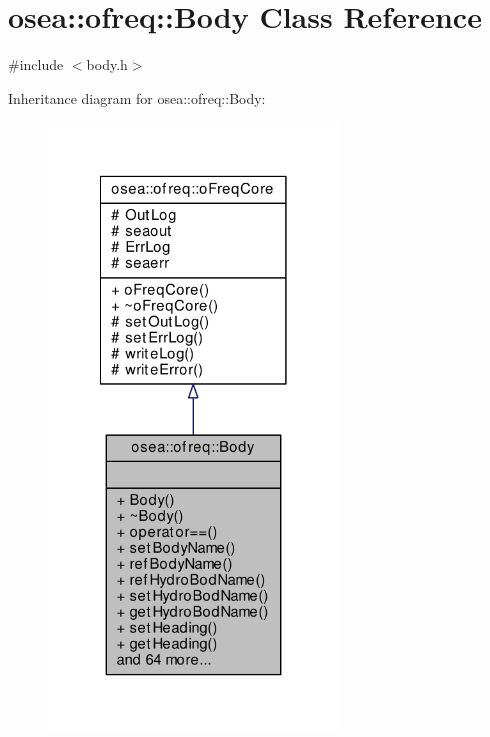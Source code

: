 \hypertarget{classosea_1_1ofreq_1_1_body}{\section{osea\-:\-:ofreq\-:\-:Body Class Reference}
\label{classosea_1_1ofreq_1_1_body}
}


{\ttfamily \#include $<$body.\-h$>$}



Inheritance diagram for osea\-:\-:ofreq\-:\-:Body\-:\nopagebreak
\begin{figure}[H]
\begin{center}
\leavevmode
\includegraphics[width=218pt]{classosea_1_1ofreq_1_1_body__inherit__graph}
\end{center}
\end{figure}
